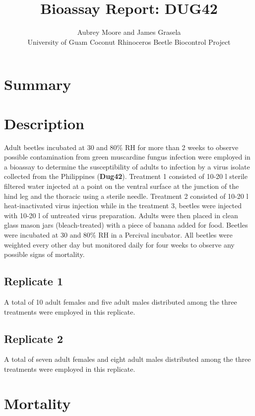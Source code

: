 \documentclass[11pt]{scrartcl}
\title{Bioassay Report: DUG42}
\author{Aubrey Moore and James Grasela\\University of Guam Coconut Rhinoceros Beetle Biocontrol Project}
\begin{document}
\begin{titlepage}
    \maketitle
    \tableofcontents
\end{titlepage}

\clearpage
\section{Summary}
\section{Description}
Adult beetles incubated at 30{\celsius} and 80\% RH for more than 2 weeks to observe possible contamination from green muscardine fungus infection were employed in a bioassay to determine the susceptibility of adults to infection by a virus isolate collected from the Philippines (\textbf{Dug42}). Treatment 1 consisted of 10-20 {\micro}l sterile filtered water injected at a point on the ventral surface at the junction of the hind leg and the thoracic using a sterile needle. Treatment 2 consisted of 10-20 {\micro}l heat-inactivated virus injection while in the treatment 3, beetles were injected with 10-20 {\micro}l of untreated virus preparation.  Adults were then placed in clean glass mason jars (bleach-treated) with a piece of banana added for food. Beetles were incubated at 30{\celsius} and 80\% RH in a Percival incubator. All beetles were weighted every other day but monitored daily for four weeks to observe any possible signs of mortality.


\subsection{Replicate 1} 

A total of 10 adult females and five adult males distributed among the three treatments were employed in this replicate. 

\subsection{Replicate 2}

A total of seven adult females and eight adult males distributed among the three treatments were employed in this replicate.

\clearpage
\section{Mortality}
\end{document}
